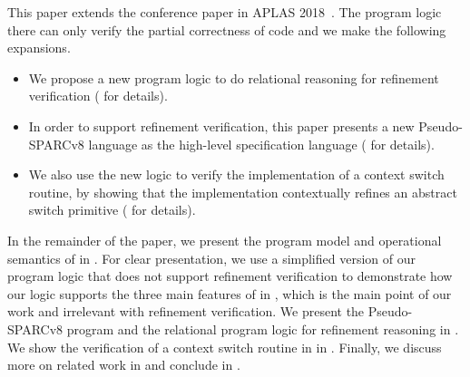 This paper extends the conference paper in
APLAS 2018~\cite{zha18aplas}.
The program logic there can only verify the partial
correctness of \sparc{} code and we make the following
expansions.
\begin{itemize}
    \item We propose a new program logic to do
        relational reasoning for refinement verification
        (\Subsec{\ref{subsec:rellogic}} for details).
    \item In order to support refinement verification,
        this paper presents a new Pseudo-SPARCv8 language
        as the high-level
        specification language
        (\Subsec{\ref{subsec:High-level Pseudo-SPARCv8 Language}}
        for details).
    \item We also use the new logic to verify the implementation
        of a context switch routine, by showing that
        the implementation contextually
        refines an abstract switch primitive
        (\Sec{\ref{sec:ctxswitch}} for details).
\end{itemize}

In the remainder of the paper,
we present the program model
and operational semantics of \sparc{} in 
\Sec{\ref{sec:modeling}}.
For clear presentation, we use a
simplified version of our program logic that
does not support refinement verification to
demonstrate how our logic supports the three main
features of \sparc{} in \Sec{\ref{sec:logic}},
which is the main point
of our work and irrelevant with
refinement verification.
We present the Pseudo-SPARCv8 program and
the relational program logic for refinement reasoning
in \Sec{\ref{sec:refine-verification-sparc}}.
We show the verification of a context switch routine
in \sparc{} in \Sec{\ref{sec:ctxswitch}}.
Finally, we discuss more on
related work in \Sec{\ref{sec:related work}}
and conclude in 
\Sec{\ref{sec:conclusion}}.
